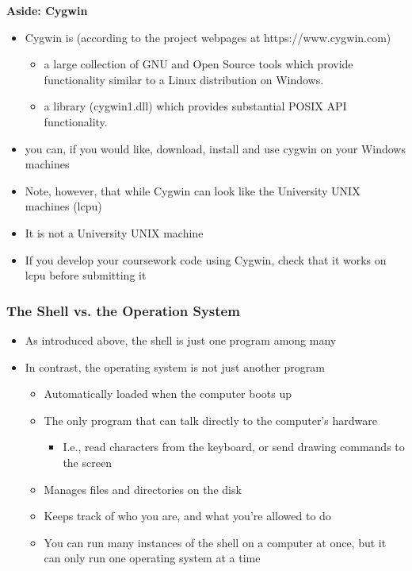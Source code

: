 \documentclass{beamer}
\begin{document}
\begin{frame}
\textbf{Aside: Cygwin}
\begin{itemize}
\item Cygwin is (according to the project webpages at https://www.cygwin.com)
\begin{itemize}
\item a large collection of GNU and Open Source tools which provide functionality similar to a Linux distribution on Windows.
\item a library (cygwin1.dll) which provides substantial POSIX API functionality.
\end{itemize}
\item you can, if you would like, download, install and use cygwin on your Windows machines
\bigskip
\item Note, however, that while Cygwin can look like the University UNIX machines (lcpu)
\item It is not a University UNIX machine
\item If you develop your coursework code using Cygwin, check that it works on lcpu before submitting it
\end{itemize}
\end{frame}

\begin{frame}\frametitle{The Shell vs. the Operation System}
\begin{itemize}
\item As introduced above, the shell is just one program among many
\item In contrast, the operating system is not just another program
\begin{itemize}
    \item Automatically loaded when the computer boots up
    \item The only program that can talk directly to the computer's hardware
\begin{itemize}
          \item I.e., read characters from the keyboard, or send drawing commands to the screen
\end{itemize}
    \item Manages files and directories on the disk
    \item Keeps track of who you are, and what you're allowed to do
    \item You can run many instances of the shell on a computer at once, but it can only run one operating system at a time
\end{itemize}
\end{itemize}
\end{frame}
\end{document}
